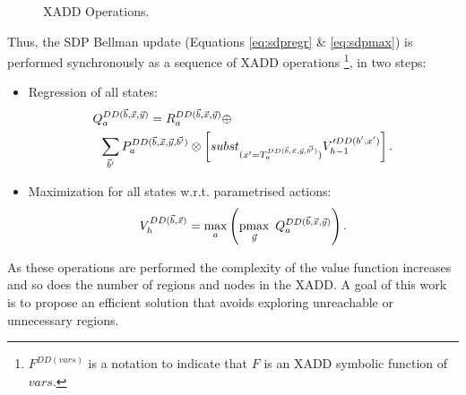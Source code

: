 \begin{figure}[th]
\center
\vspace{-2mm}

\hspace{10mm}

\vspace{-4mm}

\caption{XADD Operations.}
\vspace{-2mm}
\end{figure}

Thus, the SDP Bellman update (Equations \ref{eq:sdpregr} \& \ref{eq:sdpmax}) is performed synchronously as a sequence of XADD operations \footnote{$F^{DD(vars)}$ is a notation to indicate that $F$ is an XADD symbolic function of $vars$.}, in two steps:
\begin{itemize}
\item {Regression of all states:
\begin{align}
Q_a^{DD(\vec{b},\vec{x},\vec{y})} & =  R_a^{DD(\vec{b},\vec{x},\vec{y})} \oplus \nonumber \\
	& \hspace{-1.4cm}  \sum_{\vec{b}'}  P_a^{DD(\vec{b},\vec{x},\vec{y},\vec{b'})} \otimes \left[ subst_{(x' = T_a^{DD(\vec{b},\vec{x},\vec{y},\vec{b'})})} V_{h-1}'^{DD(b',x')} \right]. 
\label{eq:SDPregrDD}
\end{align}
}
\item{
Maximization for all states w.r.t. parametrised actions:
\begin{equation}
V_h^{DD(\vec{b},\vec{x})} = \max_{a} \left( \pmax_{\vec{y}}~ Q_a^{DD(\vec{b},\vec{x},\vec{y})} \right).
\label{eq:SDPmaxDD}
\end{equation}
}
\end{itemize}

As these operations are performed the complexity of the value function increases and so does the number of regions and nodes in the XADD. A goal of this work is to propose an efficient solution that avoids exploring unreachable or unnecessary regions.


